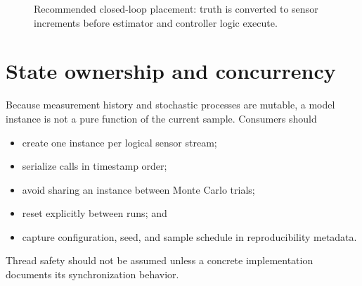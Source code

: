 \documentclass[11pt,oneside,headings=big]{scrreprt}
\newcommand{\vect}[1]{\bm{#1}}
\begin{document}
    \begin{figure}[htbp]
        \centering
        \caption{Recommended closed-loop placement: truth is converted to sensor
        increments before estimator and controller logic execute.}
        \label{fig:closed-loop}
    \end{figure}


    \section{State ownership and concurrency}
    Because measurement history and stochastic processes are mutable, a model
    instance is not a pure function of the current sample. Consumers should
    \begin{itemize}
        \item create one instance per logical sensor stream;
        \item serialize calls in timestamp order;
        \item avoid sharing an instance between Monte Carlo trials;
        \item reset explicitly between runs; and
        \item capture configuration, seed, and sample schedule in reproducibility
        metadata.
    \end{itemize}
    Thread safety should not be assumed unless a concrete implementation documents
    its synchronization behavior.
\end{document}
